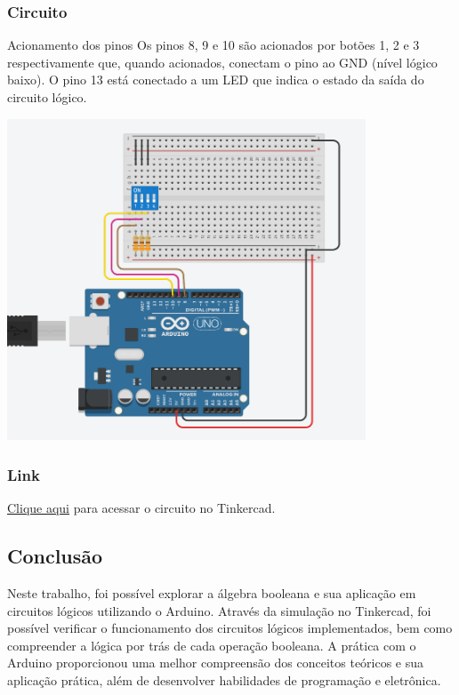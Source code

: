 \documentclass[12pt, a4paper]{article}
\begin{document}
\subsubsection*{Circuito}
\begin{mybox}{Acionamento dos pinos}
	Os pinos 8, 9 e 10 são acionados por botões 1, 2 e 3 respectivamente que, quando acionados, conectam o pino ao GND (nível lógico baixo). O pino 13 está conectado a um LED que indica o estado da saída do circuito lógico.
\end{mybox}
\begin{center}
	\includegraphics[width=0.8\textwidth]{arduino.png}
\end{center}
\subsubsection*{Link}
\href{https://www.tinkercad.com/things/hr4xBZ8MEj2/editel?returnTo=%2Fdashboard%2Fdesigns%2Fcircuits&sharecode=fPopBI4bYJNTvhWgjXuX53nz_p1ZSa5-tAANBvz1cPw}{Clique aqui} para acessar o circuito no Tinkercad.

\newpage
\begin{center}
	\section{Conclusão}
\end{center}

Neste trabalho, foi possível explorar a álgebra booleana e sua aplicação em circuitos lógicos utilizando o Arduino. Através da simulação no Tinkercad, foi possível verificar o funcionamento dos circuitos lógicos implementados, bem como compreender a lógica por trás de cada operação booleana. A prática com o Arduino proporcionou uma melhor compreensão dos conceitos teóricos e sua aplicação prática, além de desenvolver habilidades de programação e eletrônica.
\end{document}
